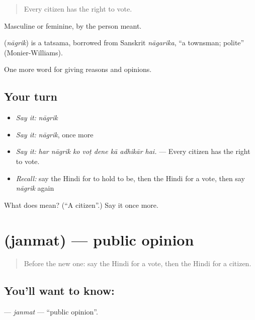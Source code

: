 \begin{quote}
Every citizen has the right to vote.
\end{quote}

Masculine or feminine, by the person meant.

\begin{cousinweb}
\textbf{} (\emph{nāgrik}) is a tatsama, borrowed from Sanskrit \emph{nāgarika}, \textquotedblleft{}a townsman; polite\textquotedblright{} (Monier-Williams).
\end{cousinweb}

\begin{grammarlens}[title={What you've built}]
One more word for giving reasons and opinions.
\end{grammarlens}

\subsection*{Your turn}
\begin{itemize}
\raggedright
  \item \emph{Say it:} \emph{nāgrik}
  \item \emph{Say it:} \emph{nāgrik}, once more
  \item \emph{Say it:} \emph{har nāgrik ko voṭ dene kā adhikār hai.} — Every citizen has the right to vote.
  \item \emph{Recall:} say the Hindi for to hold to be, then the Hindi for a vote, then say \emph{nāgrik} again
\end{itemize}

\begin{tcolorbox}[breakable,colback=teal!4,colframe=teal!35!black,title={Before you move on}]
What does  mean? (\textquotedblleft{}A citizen\textquotedblright{}.) Say it once more.
\end{tcolorbox}
\section[\texorpdfstring{\hi{जनमत} (janmat)}{जनमत (janmat)}]{ (janmat) — public opinion}

\label{lesson:HI-C354-janmat}



\begin{quote}
Before the new one: say the Hindi for a vote, then the Hindi for a citizen.
\end{quote}

\subsection*{You'll want to know: }
\textbf{} — \emph{janmat} — \textquotedblleft{}public opinion\textquotedblright{}.

